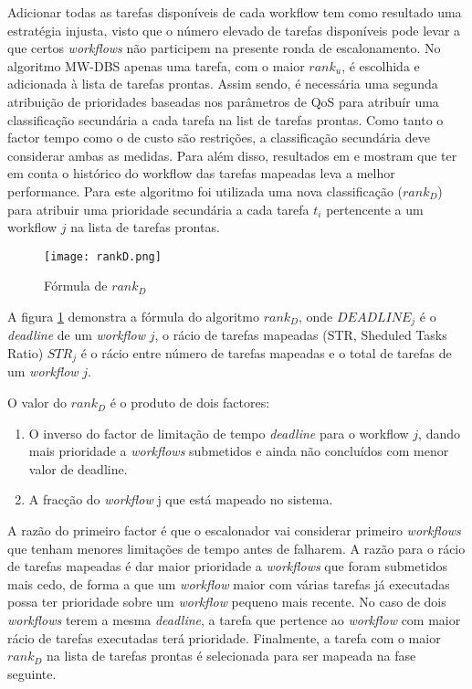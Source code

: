 Adicionar todas as tarefas disponíveis de cada workflow tem como resultado uma estratégia injusta, visto que o número elevado de tarefas disponíveis pode levar a que certos \textit{workflows} não participem na presente ronda de escalonamento. No algoritmo MW-DBS apenas uma tarefa, com o maior $rank_u$, é escolhida e adicionada à lista de tarefas prontas.
Assim sendo, é necessária uma segunda atribuição de prioridades baseadas nos parâmetros de QoS para atribuír uma classificação secundária a cada tarefa na list de tarefas prontas.
Como tanto o factor tempo como o de custo são restrições, a classificação secundária deve considerar ambas as medidas.
Para além disso, resultados em \cite{Arabnejad2012} e \cite{Arabnejad2014a} mostram que ter em conta o histórico do workflow das tarefas mapeadas leva a melhor performance.
Para este algoritmo foi utilizada uma nova classificação ($rank_D$) para atribuir uma prioridade secundária a cada tarefa $t_i$ pertencente a um workflow $j$ na lista de tarefas prontas. 

\begin{figure}[H]
	\centering
	\texttt{[image: rankD.png]}
	\caption{Fórmula de $rank_D$}
	\label{rankD}
\end{figure}

A figura \ref{rankD} demonstra a fórmula do algoritmo $rank_D$, onde $DEADLINE_j$ é o \textit{deadline} de um \textit{workflow} $j$, o rácio de tarefas mapeadas (STR, Sheduled Tasks Ratio) $STR_j$ é o rácio entre número de tarefas mapeadas e o total de tarefas de um \textit{workflow} $j$.

O valor do $rank_D$ é o produto de dois factores:
\begin{enumerate}
	\item O inverso do factor de limitação de tempo \textit{deadline} para o workflow $j$, dando mais prioridade a \textit{workflows} submetidos e ainda não concluídos com menor valor de deadline.
	\item A fracção do \textit{workflow} j que está mapeado no sistema.
\end{enumerate}
A razão do primeiro factor é que o escalonador vai considerar primeiro \textit{workflows} que tenham menores limitações de tempo antes de falharem. A razão para o rácio de tarefas mapeadas é dar maior prioridade a \textit{workflows} que foram submetidos mais cedo, de forma a que um \textit{workflow} maior com várias tarefas já executadas possa ter prioridade sobre um \textit{workflow} pequeno mais recente.
No caso de dois \textit{workflows} terem a mesma \textit{deadline}, a tarefa que pertence ao \textit{workflow} com maior rácio de tarefas executadas terá prioridade.
Finalmente, a tarefa com o maior $rank_D$ na lista de tarefas prontas é selecionada para ser mapeada na fase seguinte.


